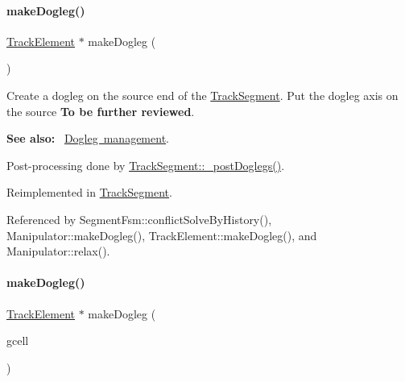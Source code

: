 \mbox{\label{classKite_1_1TrackElement_a7a9637875364e84e6862de0102341715}} 
\paragraph{\texorpdfstring{make\+Dogleg()}{makeDogleg()}\hspace{0.1cm}{\footnotesize\ttfamily [1/3]}}
{\footnotesize\ttfamily \mbox{\hyperlink{classKite_1_1TrackElement}{Track\+Element}} $\ast$ make\+Dogleg (\begin{DoxyParamCaption}{ }\end{DoxyParamCaption})\hspace{0.3cm}{\ttfamily [virtual]}}

Create a dogleg on the source end of the \mbox{\hyperlink{classKite_1_1TrackSegment}{Track\+Segment}}. Put the dogleg axis on the source {\bfseries To be further reviewed}.

{\bfseries See also\+:}~ \mbox{\hyperlink{classKite_1_1TrackSegment_secDogleg}{Dogleg management}}.

Post-\/processing done by \mbox{\hyperlink{classKite_1_1TrackSegment_a10a45c049d0bd7d01c7eff1c5441c7a2}{Track\+Segment\+::\+\_\+post\+Doglegs()}}. 

Reimplemented in \mbox{\hyperlink{classKite_1_1TrackSegment_a7a9637875364e84e6862de0102341715}{Track\+Segment}}.



Referenced by Segment\+Fsm\+::conflict\+Solve\+By\+History(), Manipulator\+::make\+Dogleg(), Track\+Element\+::make\+Dogleg(), and Manipulator\+::relax().

\mbox{\label{classKite_1_1TrackElement_a3e1b4982a2427f74e55592520ab6272d}} 
\paragraph{\texorpdfstring{make\+Dogleg()}{makeDogleg()}\hspace{0.1cm}{\footnotesize\ttfamily [2/3]}}
{\footnotesize\ttfamily \mbox{\hyperlink{classKite_1_1TrackElement}{Track\+Element}} $\ast$ make\+Dogleg (\begin{DoxyParamCaption}\item[{\textbf{ Katabatic\+::\+G\+Cell} $\ast$}]{gcell }\end{DoxyParamCaption})\hspace{0.3cm}{\ttfamily [inline]}}

